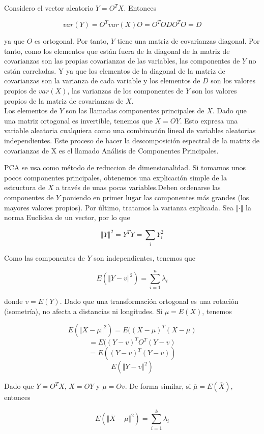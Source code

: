 	Considero el vector aleatorio $Y = O^T X$. Entonces
	
	$$var(Y) = O^T var(X) O = O^T ODO^T O = D$$
	
	ya que $O$ es ortogonal. Por tanto, $Y$ tiene una matriz de covarianzas diagonal. Por tanto, como los elementos que están fuera de la diagonal de la matriz de covarianzas son las propias covarianzas de las variables, las componentes de $Y$ no están correladas. Y ya que los elementos de la diagonal de la matriz de covarianzas son la varianza de cada variable y los elementos de $D$ son los valores propios de $var(X)$, las varianzas de los componentes de $Y$ son los valores propios de la matriz de covarianzas de $X$. \\
	
	Los elementos de $Y$ son las llamadas componentes principales de $X$. Dado que una matriz ortogonal es invertible, tenemos que $X = OY$. Esto expresa una variable aleatoria cualquiera como una combinación lineal de variables aleatorias independientes. Este proceso de  hacer la descomposición espectral de la matriz de covarianzas de X es el llamado Análisis de Componentes Principales.
	
	PCA se usa como método de reduccion de dimensionalidad. Si tomamos unos pocos componentes principales, obtenemos una explicación simple de la estructura de $X$ a través de unas pocas variables.Deben ordenarse las componentes de $Y$ poniendo en primer lugar las componentes más grandes (los mayores valores propios). Por último, tratamos la varianza explicada. Sea $\Vert · \Vert$ la norma Euclidea de un vector, por lo que
	
	$$ \Vert Y \Vert^2 = Y^T Y = \sum_{i} Y_i^2$$
	
	Como las componentes de $Y$ son independientes, tenemos que 
	
	$$E(\Vert Y - v \Vert^2) = \sum_{i=1}^{n} \lambda_i$$
	
	donde $v = E(Y)$. Dado que una transformación ortogonal es una rotación (isometría), no afecta a distancias ni longitudes. Si $\mu = E(X)$, tenemos
	
	$$E(\Vert X -\mu \Vert^2) = E((X-\mu)^T (X-\mu)$$
	$$ = E((Y-v)^T O^T (Y-v)$$
	$$ = E((Y-v)^T (Y-v)) $$
	$$E(\Vert Y-v \Vert^2)$$
	
	Dado que $Y = O^TX$, $X = OY$ y $\mu = O v$. De forma similar, si $\overline{\mu} = E(\overline{X})$, entonces
	
	$$E(\Vert \overline{X}- \overline{\mu} \Vert^2) = \sum_{i=1}^{k} \lambda_i$$
	
